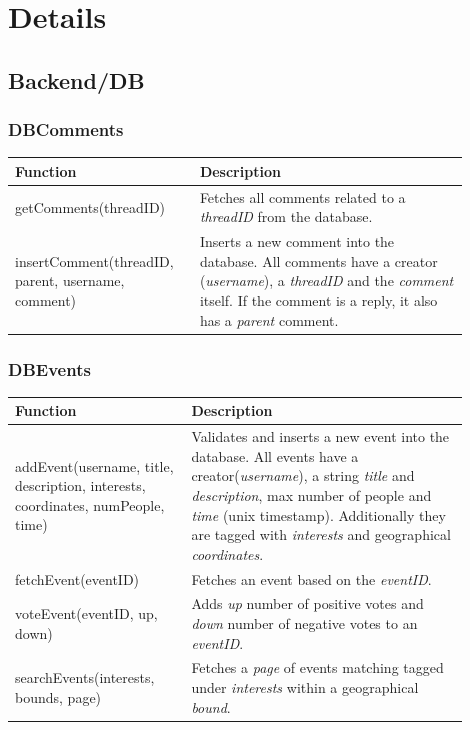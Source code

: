 \section{Details}
\label{sec:CodeDetails}

\subsection{Backend/DB}
\label{subsec:CodeDetailsBackendDB}

\subsubsection{DBComments}
\begin{minipage}{\linewidth}
  \centering
  \setlength{\tabcolsep}{12pt}
  \begin{tabular}{|p{0.35\linewidth}|p{0.55\linewidth}|}
  \hline
  \cellcolor{gray!25} Function & \cellcolor{gray!25} Description \\
  \hline
  getComments(threadID) & Fetches all comments related to a \textit{threadID} from the database. \\
  insertComment(threadID, parent, username, comment) & Inserts a new comment into the database. All comments have a creator (\textit{username}), a \textit{threadID} and the \textit{comment} itself. If the comment is a reply, it also has a \textit{parent} comment. \\
  \hline  
  \end{tabular}
\end{minipage}

\subsubsection{DBEvents}
\begin{minipage}{\linewidth}
  \centering
  \setlength{\tabcolsep}{12pt}
  \begin{tabular}{|p{0.35\linewidth}|p{0.55\linewidth}|}
  \hline
  \cellcolor{gray!25} Function & \cellcolor{gray!25} Description \\
  \hline
  addEvent(username, title, description, interests, coordinates, numPeople, time) & Validates and inserts a new event into the database. All events have a creator(\textit{username}), a string \textit{title} and \textit{description}, max number of people and \textit{time} (unix timestamp). Additionally they are tagged with \textit{interests} and geographical \textit{coordinates}. \\
  fetchEvent(eventID) & Fetches an event based on the \textit{eventID}. \\
  voteEvent(eventID, up, down) & Adds \textit{up} number of positive votes and \textit{down} number of negative votes to an \textit{eventID}. \\
  searchEvents(interests, bounds, page) & Fetches a \textit{page} of events matching tagged under \textit{interests} within a geographical \textit{bound}. \\
  \hline  
  \end{tabular}
\end{minipage}


